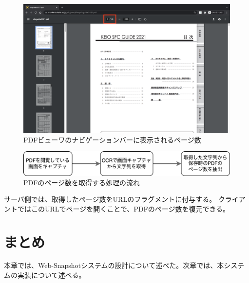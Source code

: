 \begin{figure}[htbp]
  \caption{PDFビューワのナビゲーションバーに表示されるページ数}
  \label{fig:pdf-viewer-nav-bar-page-num}
  \begin{center}
    \includegraphics[bb=0 0 1440 900,width=15cm]{img/040_design/pdf-viewer-nav-bar-page-num.pdf}
  \end{center}
\end{figure}

\begin{figure}[htbp]
  \caption{PDFのページ数を取得する処理の流れ}
  \label{fig:design-pdf-page-num-extract}
  \begin{center}
    \includegraphics[bb=0 0 511 61,width=15cm]{img/040_design/design-pdf-page-num-extract.pdf}
  \end{center}
\end{figure}

サーバ側では、取得したページ数をURLのフラグメントに付与する。
クライアントではこのURLでページを開くことで、PDFのページ数を復元できる。

\section{まとめ}
本章では、Web-Snapshotシステムの設計について述べた。次章では、本システムの実装について述べる。
